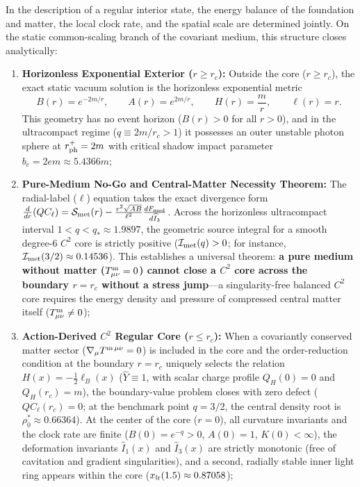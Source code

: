 \documentclass[11pt,a4paper]{article}
\begin{document}
In the description of a regular interior state, the energy balance of the foundation and matter, the local clock rate, and the spatial scale are determined jointly. On the static common-scaling branch of the covariant medium, this structure closes analytically:
\begin{enumerate}[label=\arabic*.]
\item \textbf{Horizonless Exponential Exterior ($r \ge r_c$):} Outside the core ($r \ge r_c$), the exact static vacuum solution is the horizonless exponential metric
\begin{equation}
B(r) = e^{-2m/r}, \qquad A(r) = e^{2m/r}, \qquad H(r) = \frac{m}{r}, \qquad \ell(r) = r.
\end{equation}
This geometry has no event horizon ($B(r) > 0$ for all $r > 0$), and in the ultracompact regime ($q \equiv 2m/r_c > 1$) it possesses an outer unstable photon sphere at $r_{\rm ph}^+ = 2m$ with critical shadow impact parameter $b_c = 2e m \approx 5.4366 m$;
\item \textbf{Pure-Medium No-Go and Central-Matter Necessity Theorem:} The radial-label ($\ell$) equation takes the exact divergence form $\frac{d}{dr}(Q C_\ell) = \mathcal{S}_{\rm met}(r) - \frac{r^2\sqrt{AB}}{\ell^2}\frac{dF_{\rm med}}{d\widehat{I}_3}$. Across the horizonless ultracompact interval $1 < q < q_* \approx 1.9897$, the geometric source integral for a smooth degree-6 $C^2$ core is strictly positive ($\mathcal{I}_{\rm met}(q) > 0$; for instance, $\mathcal{I}_{\rm met}(3/2) \approx 0.14536$). This establishes a universal theorem: \textbf{a pure medium without matter ($T^{\rm m}_{\mu\nu} = 0$) cannot close a $C^2$ core across the boundary $r = r_c$ without a stress jump}---a singularity-free balanced $C^2$ core requires the energy density and pressure of compressed central matter itself ($T^{\rm m}_{\mu\nu} \neq 0$);
\item \textbf{Action-Derived $C^2$ Regular Core ($r \le r_c$):} When a covariantly conserved matter sector ($\nabla_\mu T^{\rm m\,\mu\nu} = 0$) is included in the core and the order-reduction condition at the boundary $r = r_c$ uniquely selects the relation $H(x) = -\frac{1}{2}\ell_B(x)$ ($\widehat{Y} \equiv 1$, with scalar charge profile $Q_H(0)=0$ and $Q_H(r_c)=m$), the boundary-value problem closes with zero defect ($Q C_\ell(r_c) = 0$; at the benchmark point $q = 3/2$, the central density root is $\rho_0^* \approx 0.66364$). At the center of the core ($r=0$), all curvature invariants and the clock rate are finite ($B(0) = e^{-q} > 0$, $A(0) = 1$, $K(0) < \infty$), the deformation invariants $\widehat{I}_1(x)$ and $\widehat{I}_3(x)$ are strictly monotonic (free of cavitation and gradient singularities), and a second, radially stable inner light ring appears within the core ($x_{\rm lr}(1.5) \approx 0.87058$);

\end{enumerate}
\end{document}
